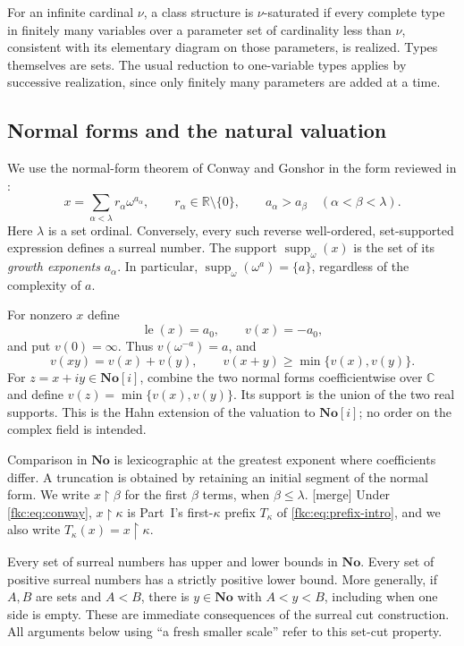\documentclass[11pt,letterpaper]{article}
\numberwithin{equation}{section}
\theoremstyle{definition}
\theoremstyle{remark}
\newcommand{\R}{\mathbb R}
\newcommand{\C}{\mathbb C}
\newcommand{\No}{\mathbf{No}}
\newcommand{\mergetag}{\textup{\textsf{\small[merge]}}}%
\newcommand{\SC}{\mathbf{No}[i]}
\newcommand{\suppw}{\operatorname{supp}_{\omega}}
\newcommand{\lead}{\operatorname{le}}
\newcommand{\restr}{\mathbin{\upharpoonright}}
\begin{document}
For an infinite cardinal $\nu$, a class structure is $\nu$-saturated if every complete type in finitely many variables over a parameter set of cardinality less than $\nu$, consistent with its elementary diagram on those parameters, is realized. Types themselves are sets. The usual reduction to one-variable types applies by successive realization, since only finitely many parameters are added at a time.

\subsection{Normal forms and the natural valuation}
We use the normal-form theorem of Conway and Gonshor in the form reviewed in \cite[Section~2]{MM}:
\begin{equation}\label{fkc:sb:eq:nf}
 x=\sum_{\alpha<\lambda}r_\alpha\omega^{a_\alpha},\qquad
 r_\alpha\in\R\setminus\{0\},\qquad
 a_\alpha>a_\beta\quad(\alpha<\beta<\lambda).
\end{equation}
Here $\lambda$ is a set ordinal. Conversely, every such reverse well-ordered, set-supported expression defines a surreal number. The support $\suppw(x)$ is the set of its \emph{growth exponents} $a_\alpha$. In particular, $\suppw(\omega^a)=\{a\}$, regardless of the complexity of $a$.

For nonzero $x$ define
\[
 \lead(x)=a_0,\qquad v(x)=-a_0,
\]
and put $v(0)=\infty$. Thus $v(\omega^{-a})=a$, and
\[
 v(xy)=v(x)+v(y),\qquad v(x+y)\ge\min\{v(x),v(y)\}.
\]
For $z=x+iy\in\SC$, combine the two normal forms coefficientwise over $\C$ and define $v(z)=\min\{v(x),v(y)\}$. Its support is the union of the two real supports. This is the Hahn extension of the valuation to $\SC$; no order on the complex field is intended.

Comparison in $\No$ is lexicographic at the greatest exponent where coefficients differ. A truncation is obtained by retaining an initial segment of the normal form. We write $x\restr\beta$ for the first $\beta$ terms, when $\beta\le\lambda$. \mergetag{} Under \eqref{fkc:eq:conway}, $x\restr\kappa$ is Part~I's first-$\kappa$ prefix $T_\kappa$ of \eqref{fkc:eq:prefix-intro}, and we also write $T_\kappa(x)=x\restr\kappa$.

Every set of surreal numbers has upper and lower bounds in $\No$. Every set of positive surreal numbers has a strictly positive lower bound. More generally, if $A,B$ are sets and $A<B$, there is $y\in\No$ with $A<y<B$, including when one side is empty. These are immediate consequences of the surreal cut construction. All arguments below using ``a fresh smaller scale'' refer to this set-cut property.
\end{document}
